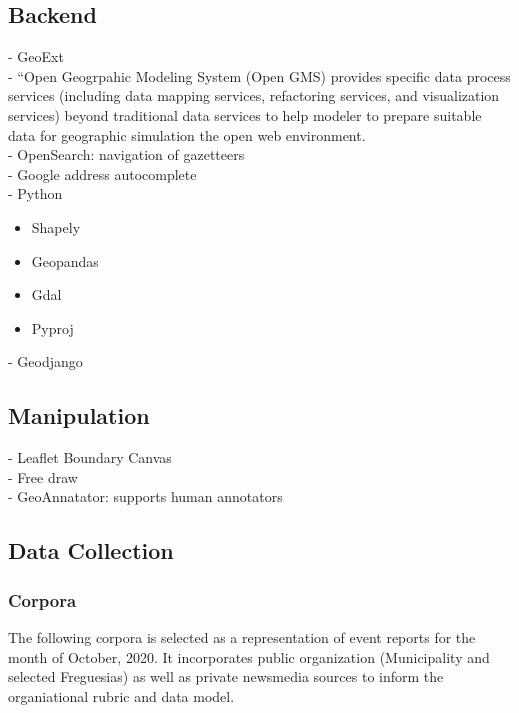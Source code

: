 \subsection{Backend}
- GeoExt \cite{Bhattacharya2018}\\
- {\color{orange}“Open Geogrpahic Modeling System (Open GMS) provides specific data process services (including data mapping services, refactoring services, and visualization services) beyond traditional data services to help modeler to prepare suitable data for geographic simulation the open web environment.\cite{Jiang2020}}\\
- OpenSearch: navigation of gazetteers \cite{Jiang2020}\\
- Google address autocomplete \cite{Fitoussi}\\ %
- Python \cite{Sami2019}\\
\begin{itemize}
	\item Shapely \cite{Sami2019}
	\item Geopandas \cite{Sami2019}
	\item Gdal \cite{Sami2019}
	\item Pyproj \cite{Sami2019}
\end{itemize}
- Geodjango \cite{Sami2019}\\

\subsection{Manipulation}
- Leaflet Boundary Canvas\\
- Free draw\\
- GeoAnnatator: {supports human annotators \cite{Karimzadeh2019}}



\subsection{Data Collection}
\subsubsection{Corpora}
The following corpora is selected as a representation of event reports for the month of October, 2020. It incorporates public organization (Municipality and selected Freguesias) as well as private newsmedia sources to inform the organiational rubric and data model.  

